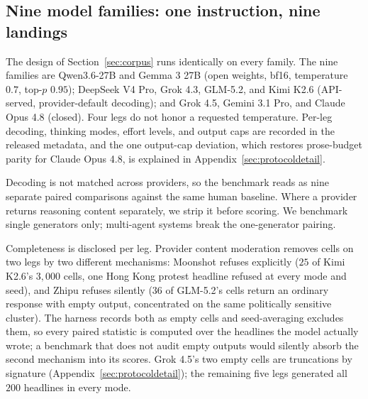 \documentclass{article}
\begin{document}
\subsection{Nine model families: one instruction, nine landings}
\label{sec:ninefam}
The design of Section~\ref{sec:corpus} runs identically on every family.
The nine families are Qwen3.6-27B and Gemma 3 27B (open weights, bf16, temperature $0.7$,
top-$p$ $0.95$); DeepSeek V4 Pro, Grok 4.3, GLM-5.2, and Kimi K2.6 (API-served,
provider-default decoding); and Grok 4.5, Gemini 3.1 Pro, and Claude Opus 4.8 (closed). Four
legs do not honor a requested temperature. Per-leg decoding, thinking modes, effort levels,
and output caps are recorded in the released metadata, and the one output-cap deviation, which
restores prose-budget parity for Claude Opus 4.8, is explained in
Appendix~\ref{sec:protocoldetail}.

Decoding is not matched across providers, so the benchmark reads as nine separate paired
comparisons against the same human baseline. Where a provider returns reasoning content
separately, we strip it before scoring. We benchmark single generators only; multi-agent
systems break the one-generator pairing.

Completeness is disclosed per leg. Provider content moderation removes cells on two legs by two
different mechanisms: Moonshot refuses explicitly ($25$ of Kimi K2.6's $3{,}000$ cells, one
Hong Kong protest headline refused at every mode and seed), and Zhipu refuses silently ($36$ of
GLM-5.2's cells return an ordinary response with empty output, concentrated on the same
politically sensitive cluster). The harness records both as empty cells
and seed-averaging excludes them, so every paired statistic is computed over the headlines the
model actually wrote; a benchmark that does not audit empty outputs would silently absorb the second mechanism into its scores.
Grok 4.5's two empty cells are truncations by signature
(Appendix~\ref{sec:protocoldetail}); the remaining five legs generated all $200$ headlines in
every mode.
\end{document}

